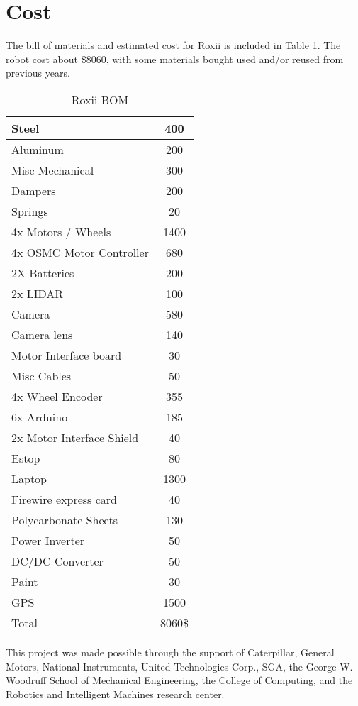 \section{Cost}

The bill of materials and estimated cost for Roxii is included in Table \ref{TAB:Cost}. The robot cost about \$8060, with some materials bought used and/or reused from previous years.

\begin{table}[H]
\begin{center}
\caption{Roxii BOM}
\begin{tabular}{| l | c |}
\hline

Steel	&	400\\	\hline
Aluminum	&	200\\	\hline
Misc Mechanical	&	300\\	\hline
Dampers	&	200\\	\hline
Springs	&	20\\	\hline
4x Motors / Wheels	&	1400\\	\hline
4x OSMC Motor Controller	&	680\\	\hline
2X Batteries & 200\\ \hline
2x LIDAR	&	100\\	\hline
Camera	&	580\\	\hline
Camera lens	&	140\\	\hline
Motor Interface board	&	30\\	\hline
Misc Cables	&	50\\	\hline
4x Wheel Encoder	&	355\\	\hline
6x Arduino	&	185\\	\hline
2x Motor Interface Shield	&	40\\	\hline
Estop	&	80\\	\hline
Laptop	&	1300\\	\hline
Firewire express card	&	40\\	\hline
Polycarbonate Sheets	&	130\\	\hline
Power Inverter	&	50\\	\hline
DC/DC Converter	&	50\\	\hline
Paint	&	30\\	\hline
GPS	&	1500\\	\hline
Total	&	8060\$\\	
\hline


\end{tabular}
\label{TAB:Cost}
\end{center}
\end{table}

This project was made possible through the support of Caterpillar, General Motors, National Instruments, United Technologies Corp., SGA, the George W. Woodruff School of Mechanical Engineering, the College of Computing, and the  Robotics and Intelligent Machines research center.
